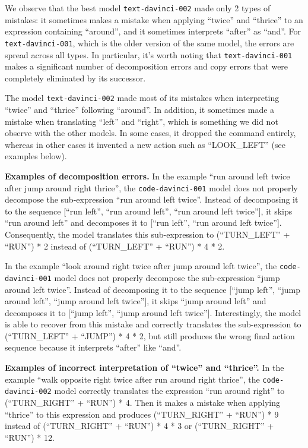 We observe that the best model \texttt{text-davinci-002} made only 2 types of mistakes: it sometimes makes a mistake when applying ``twice'' and ``thrice'' to an expression containing ``around'', and it sometimes interprets ``after'' as ``and''.  For \texttt{text-davinci-001}, which is the older version of the same model, the errors are spread across all types. In particular, it's worth noting that \texttt{text-davinci-001} makes a significant number of decomposition errors and copy errors that were completely eliminated by its successor.

The model \texttt{text-davinci-002} made most of its mistakes when interpreting ``twice'' and ``thrice'' following ``around''. In addition, it sometimes made a mistake when translating ``left'' and ``right'', which is something we did not observe with the other models. In some cases, it dropped the command entirely, whereas in other cases it invented a new action such as ``LOOK\_LEFT'' (see examples below).

\textbf{Examples of decomposition errors.}
In the example ``run around left twice after jump around right thrice'', the \texttt{code-davinci-001} model does not properly decompose the sub-expression ``run around left twice''. Instead of decomposing it to the sequence [``run left'', ``run around left'', ``run around left twice''], it skips ``run around left'' and decomposes it to [``run left'', ``run around left twice'']. Consequently, the model translates this sub-expression to (``TURN\_LEFT'' + ``RUN'') * 2 instead of (``TURN\_LEFT'' + ``RUN'') * 4 * 2.

In the example ``look around right twice after jump around left twice'', the \texttt{code-davinci-001} model does not properly decompose the sub-expression ``jump around left twice''. Instead of decomposing it to the sequence [``jump left'', ``jump around left'', ``jump around left twice''], it skips ``jump around left'' and decomposes it to [``jump left'', ``jump around left twice'']. Interestingly, the model is able to recover from this mistake and correctly translates the sub-expression to (``TURN\_LEFT'' + ``JUMP'') * 4 * 2, but still produces the wrong final action sequence because it interprets ``after'' like ``and''.

\textbf{Examples of incorrect interpretation of ``twice'' and ``thrice''.}
In the example ``walk opposite right twice after run around right thrice'', the \texttt{code-davinci-002} model correctly translates the expression ``run around right'' to (``TURN\_RIGHT'' + ``RUN'') * 4. Then it makes a mistake when applying ``thrice'' to this expression and produces (``TURN\_RIGHT'' + ``RUN'') * 9 instead of (``TURN\_RIGHT'' + ``RUN'') * 4 * 3 or (``TURN\_RIGHT'' + ``RUN'') * 12.


